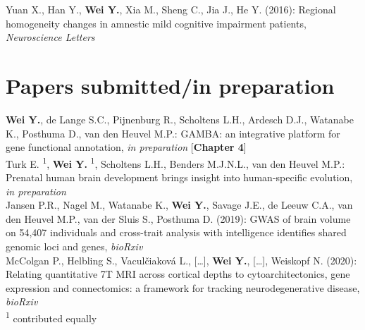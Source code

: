 \noindent
Yuan X., Han Y., \textbf{Wei Y.}, Xia M., Sheng C., Jia J., He Y. (2016): Regional homogeneity changes in amnestic mild cognitive impairment patients, \textit{Neuroscience Letters}\\

\section*{Papers submitted/in preparation}
\textbf{Wei Y.}, de Lange S.C., Pijnenburg R., Scholtens L.H., Ardesch D.J., Watanabe K., Posthuma D., van den Heuvel M.P.: GAMBA: an integrative platform for gene functional annotation, \textit{in preparation} [\textbf{Chapter 4}]\\

\noindent
Turk E. \textsuperscript{1}, \textbf{Wei Y.} \textsuperscript{1}, Scholtens L.H., Benders M.J.N.L., van den Heuvel M.P.: Prenatal human brain development brings insight into human-specific evolution, \textit{in preparation}\\

\noindent
Jansen P.R., Nagel M., Watanabe K., \textbf{Wei Y.}, Savage J.E., de Leeuw C.A., van den Heuvel M.P., van der Sluis S., Posthuma D. (2019): GWAS of brain volume on 54,407 individuals and cross-trait analysis with intelligence identifies shared genomic loci and genes, \textit{bioRxiv}\\

\noindent
McColgan P., Helbling S., Vaculčiaková L., […], \textbf{Wei Y.}, […], Weiskopf N. (2020): Relating quantitative 7T MRI across cortical depths to cytoarchitectonics, gene expression and connectomics: a framework for tracking neurodegenerative disease, \textit{bioRxiv} \\

\noindent
\textsuperscript{1} contributed equally 

